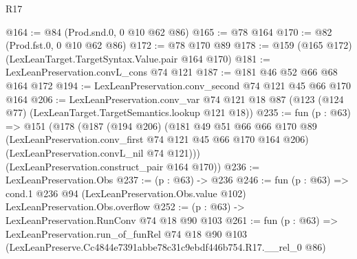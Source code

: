 \begin{lexlean}{R17}
\begin{coremodule}
@164 := @84 (Prod.snd.{0, 0} @10 @62 @86)
@165 := @78 @164
@170 := @82 (Prod.fst.{0, 0} @10 @62 @86)
@172 := @78 @170 @89
@178 := @159 (@165 @172) (LexLeanTarget.TargetSyntax.Value.pair @164 @170)
@181 := LexLeanPreservation.convL_cons @74 @121
@187 := @181 @46 @52 @66 @68 @164 @172
@194 := LexLeanPreservation.conv_second @74 @121 @45 @66 @170 @164
@206 := LexLeanPreservation.conv_var
    @74
    @121
    @18
    @87
    (@123 (@124 @77) (LexLeanTarget.TargetSemantics.lookup @121 @18))
@235 := fun (p : @63) =>
  @151
    (@178
      (@187
        (@194 @206)
        (@181
          @49
          @51
          @66
          @66
          @170
          @89
          (LexLeanPreservation.conv_first @74 @121 @45 @66 @170 @164 @206)
          (LexLeanPreservation.convL_nil @74 @121)))
      (LexLeanPreservation.construct_pair @164 @170))
@236 := LexLeanPreservation.Obs
@237 := (p : @63) -> @236
@246 := fun (p : @63) =>
  cond.{1} @236 @94 (LexLeanPreservation.Obs.value @102) LexLeanPreservation.Obs.overflow
@252 := (p : @63) -> LexLeanPreservation.RunConv @74 @18 @90 @103
@261 := fun (p : @63) =>
  LexLeanPreservation.run_of_funRel
    @74
    @18
    @90
    @103
    (LexLeanPreserve.Cc4844e7391abbe78c31c9ebdf446b754.R17.__rel_0 @86)
\end{coremodule}
\end{lexlean}
